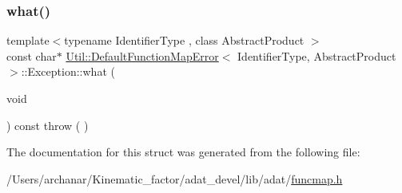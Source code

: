 \subsubsection{\texorpdfstring{what()}{what()}\hspace{0.1cm}{\footnotesize\ttfamily [2/2]}}
{\footnotesize\ttfamily template$<$typename Identifier\+Type , class Abstract\+Product $>$ \\
const char$\ast$ \mbox{\hyperlink{structUtil_1_1DefaultFunctionMapError}{Util\+::\+Default\+Function\+Map\+Error}}$<$ Identifier\+Type, Abstract\+Product $>$\+::Exception\+::what (\begin{DoxyParamCaption}\item[{void}]{ }\end{DoxyParamCaption}) const throw ( ) \hspace{0.3cm}{\ttfamily [inline]}}



The documentation for this struct was generated from the following file\+:\begin{DoxyCompactItemize}
\item 
/\+Users/archanar/\+Kinematic\+\_\+factor/adat\+\_\+devel/lib/adat/\mbox{\hyperlink{lib_2adat_2funcmap_8h}{funcmap.\+h}}\end{DoxyCompactItemize}
